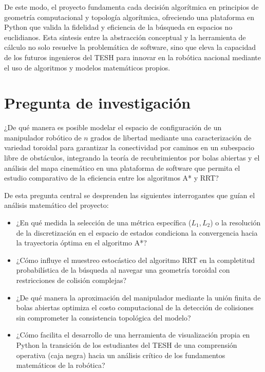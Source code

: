 De este modo, el proyecto fundamenta cada decisión algorítmica en 
principios de geometría computacional y topología algorítmica, 
ofreciendo una plataforma en Python que valida la fidelidad y eficiencia 
de la búsqueda en espacios no euclidianos. Esta síntesis entre la 
abstracción conceptual y la herramienta de cálculo no solo resuelve 
la problemática de software, sino que eleva la capacidad de los futuros 
ingenieros del TESH para innovar en la robótica nacional mediante el 
uso de algoritmos y modelos matemáticos propios.




\section{Pregunta de investigación} 

¿De qué manera es posible modelar el espacio de configuración de un manipulador robótico de $n$ grados de 
libertad mediante una caracterización de variedad toroidal para garantizar la conectividad por caminos en un subespacio 
libre de obstáculos, integrando la teoría de recubrimientos por bolas abiertas y el análisis del mapa cinemático en 
una plataforma de software que permita el estudio comparativo de la eficiencia entre los algoritmos A* y RRT?

De esta pregunta central se desprenden las siguientes interrogantes que guían el análisis matemático del proyecto: 
\begin{itemize}
 
    \item ¿En qué medida la selección de una métrica específica ($L_1, L_2$) o la resolución de la discretización 
    en el espacio de estados condiciona la convergencia hacia la trayectoria óptima en el algoritmo A*?
 
 \item ¿Cómo influye el muestreo estocástico del algoritmo RRT en la completitud probabilística de la búsqueda al 
 navegar una geometría toroidal con restricciones de colisión complejas?
 
 \item ¿De qué manera la aproximación del manipulador mediante la unión finita de bolas abiertas optimiza el 
 costo computacional de la detección de colisiones sin comprometer la consistencia topológica del modelo?
 
 \item ¿Cómo facilita el desarrollo de una herramienta de visualización propia en Python la 
 transición de los estudiantes del TESH de una comprensión operativa (caja negra) hacia un análisis crítico de los 
 fundamentos matemáticos de la robótica?
\end{itemize}


